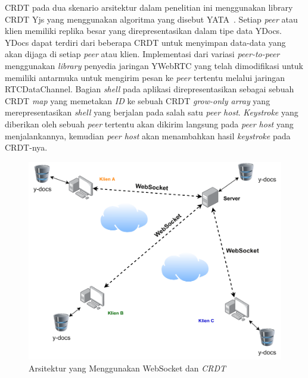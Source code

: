 CRDT pada dua skenario arsitektur dalam penelitian ini menggunakan library CRDT Yjs yang menggunakan algoritma yang disebut YATA~\citep{Nicolaescu2016yjs}. Setiap \textit{peer} atau klien memiliki replika besar yang direpresentasikan dalam tipe data YDocs. YDocs dapat terdiri dari beberapa CRDT untuk menyimpan data-data yang akan dijaga di setiap \textit{peer} atau klien. Implementasi dari variasi \textit{peer-to-peer} menggunakan \textit{library} penyedia jaringan YWebRTC yang telah dimodifikasi untuk memiliki antarmuka untuk mengirim pesan ke \textit{peer} tertentu melalui jaringan RTCDataChannel. Bagian \textit{shell} pada aplikasi direpresentasikan sebagai sebuah CRDT \textit{map} yang memetakan \textit{ID} ke sebuah CRDT \textit{grow-only array} yang merepresentasikan \textit{shell} yang berjalan pada salah satu \textit{peer host}. \textit{Keystroke} yang diberikan oleh sebuah \textit{peer} tertentu akan dikirim langsung pada \textit{peer host} yang menjalankannya, kemudian \textit{peer host} akan menambahkan hasil \textit{keystroke} pada CRDT-nya.

\begin{figure}
    \centering
    \includegraphics[scale=0.42]{assets/skripsi/Arsitektur_WebSocket_CRDT}
    \caption{Arsitektur yang Menggunakan WebSocket dan \textit{CRDT}}
\end{figure}

